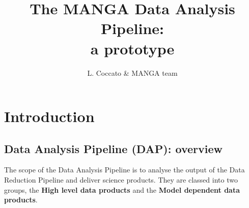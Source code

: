 \documentclass[11pt]{book}
\newcommand{\kms}{km s$^{-1}$}
\begin{document}
\begin{titlepage}
\title{{\Huge The MANGA Data Analysis Pipeline: \\
a prototype}}
\author{L. Coccato \& MANGA team}
\end{titlepage}

\maketitle
\tableofcontents

%
%
%
%
%
%
%
%




\chapter{Introduction}
\label{dap_chap:introduction}


\section{Data Analysis Pipeline (DAP): overview}
\label{dap_sec:dap_overview}

The scope of the Data Analysis Pipeline is to analyse the output of
the Data Reduction Pipeline and deliver science products. They are
classed into two groups, the {\bf High level data products} and the
{\bf Model dependent data products}.
\end{document}
